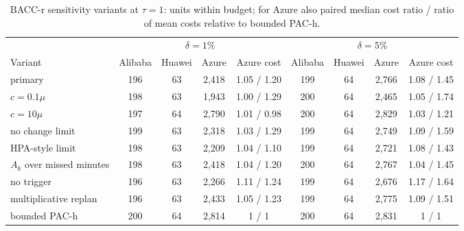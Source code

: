 \begin{table}[!htbp]\centering\footnotesize\setlength{\tabcolsep}{4pt}
\caption{BACC-r sensitivity variants at $\tau=1$: units within budget; for Azure also paired median cost ratio / ratio of mean costs relative to bounded PAC-h.}
\label{tab:bacc_variants}
\begin{tabular}{@{}lcccccccc@{}}\toprule
 & \multicolumn{4}{c}{$\delta=1\%$} & \multicolumn{4}{c}{$\delta=5\%$} \\ \cmidrule(lr){2-5}\cmidrule(l){6-9}
Variant & Alibaba & Huawei & Azure & Azure cost & Alibaba & Huawei & Azure & Azure cost \\ \midrule
primary & 196 & 63 & 2,418 & 1.05 / 1.20 & 199 & 64 & 2,766 & 1.08 / 1.45 \\
$c=0.1\mu$ & 198 & 63 & 1,943 & 1.00 / 1.29 & 200 & 64 & 2,465 & 1.05 / 1.74 \\
$c=10\mu$ & 197 & 64 & 2,790 & 1.01 / 0.98 & 200 & 64 & 2,829 & 1.03 / 1.21 \\
no change limit & 199 & 63 & 2,318 & 1.03 / 1.29 & 199 & 64 & 2,749 & 1.09 / 1.59 \\
HPA-style limit & 198 & 63 & 2,209 & 1.04 / 1.10 & 199 & 64 & 2,721 & 1.08 / 1.43 \\
$A_k$ over missed minutes & 198 & 63 & 2,418 & 1.04 / 1.20 & 200 & 64 & 2,767 & 1.04 / 1.45 \\
no trigger & 196 & 63 & 2,266 & 1.11 / 1.24 & 199 & 64 & 2,676 & 1.17 / 1.64 \\
multiplicative replan & 196 & 63 & 2,433 & 1.05 / 1.23 & 199 & 64 & 2,775 & 1.09 / 1.51 \\
\midrule bounded PAC-h & 200 & 64 & 2,814 & 1 / 1 & 200 & 64 & 2,831 & 1 / 1 \\ \bottomrule
\end{tabular}\end{table}

